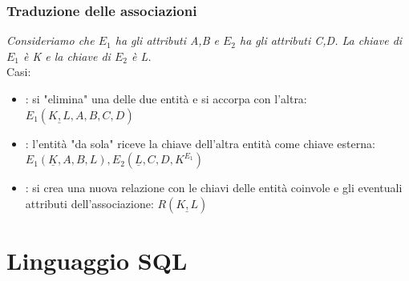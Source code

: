 \documentclass[12pt, a4paper]{report}
\begin{document}
    \subsection{Traduzione delle associazioni}
    \begin{center}
    \end{center}
    \textit{Consideriamo che $E_{1}$ ha gli attributi A,B e $E_{2}$ ha gli attributi C,D. La chiave di $E_{1}$ è K e la chiave di $E_{2}$ è L.}\\
    Casi:
    \begin{itemize}
        \item {}: si "elimina" una delle due entità e si accorpa con l'altra: $E_{1}(\underline{K,L},A,B,C,D)$
        \item {}: l'entità "da sola" riceve la chiave dell'altra entità come chiave esterna: $E_{1}(\underline{K},A,B,L),E_{2}(\underline{L},C,D, K^{E_{1}})$
        \item {}: si crea una nuova relazione con le chiavi delle entità coinvole e gli eventuali attributi dell'associazione: $R(\underline{K,L})$
    \end{itemize}
    \chapter{Linguaggio SQL}
\end{document}
